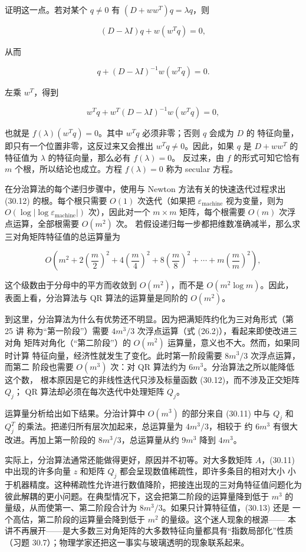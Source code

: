 \documentclass[UTF8,fontset=none,12pt]{ctexart}
\begin{document}
证明这一点。若对某个 $q\ne0$ 有
$(D+ww^T)q=\lambda q$，则

$$
(D-\lambda I)q+w(w^Tq)=0,
$$

从而

$$
q+(D-\lambda I)^{-1}w(w^Tq)=0.
$$

左乘 $w^T$，得到

$$
w^Tq+w^T(D-\lambda I)^{-1}w(w^Tq)=0,
$$

也就是 $f(\lambda)(w^Tq)=0$。其中 $w^Tq$ 必须非零；否则 $q$ 会成为 $D$ 的
特征向量，即只有一个位置非零，这反过来又会推出 $w^Tq\ne0$。因此，如果
$q$ 是 $D+ww^T$ 的特征值为 $\lambda$ 的特征向量，那么必有 $f(\lambda)=0$。
反过来，由 $f$ 的形式可知它恰有 $m$ 个根，所以结论也成立。方程
$f(\lambda)=0$ 称为 secular 方程。

在分治算法的每个递归步骤中，使用与 Newton 方法有关的快速迭代过程求出
(30.12) 的根。每个根只需要 $O(1)$ 次迭代（如果把
$\varepsilon_{\mathrm{machine}}$ 视为变量，则为
$O(\log|\log\varepsilon_{\mathrm{machine}}|)$ 次），因此对一个
$m\times m$ 矩阵，每个根需要 $O(m)$ 次浮点运算，全部根需要 $O(m^2)$ 次。
若假设递归每一步都把维数准确减半，那么求三对角矩阵特征值的总运算量为

\begin{equation}
O\!\left(m^2+2\left(\frac m2\right)^2
 +4\left(\frac m4\right)^2
 +8\left(\frac m8\right)^2
 +\cdots+m\left(\frac m m\right)^2\right),
\tag{30.13}
\end{equation}

这个级数由于分母中的平方而收敛到 $O(m^2)$，而不是 $O(m^2\log m)$。因此，
表面上看，分治算法与 QR 算法的运算量是同阶的 $O(m^2)$。

到这里，分治算法为什么有优势还不明显。因为把满矩阵约化为三对角形式（第 25 讲
称为“第一阶段”）需要 $4m^3/3$ 次浮点运算（式 (26.2)），看起来即使改进三对角
矩阵对角化（“第二阶段”）的 $O(m^2)$ 运算量，意义也不大。然而，如果同时计算
特征向量，经济性就发生了变化。此时第一阶段需要 $8m^3/3$ 次浮点运算，而第二
阶段也需要 $O(m^3)$ 次：对 QR 算法约为 $6m^3$。分治算法之所以能降低这个数，
根本原因是它的非线性迭代只涉及标量函数 (30.12)，而不涉及正交矩阵 $Q_j$；
QR 算法却必须在每次迭代中处理矩阵 $Q_j$。

运算量分析给出如下结果。分治计算中 $O(m^3)$ 的部分来自 (30.11) 中与 $Q_j$
和 $Q_j^T$ 的乘法。把递归所有层次加起来，总运算量为 $4m^3/3$，相较于
约 $6m^3$ 有很大改进。再加上第一阶段的 $8m^3/3$，总运算量从约 $9m^3$
降到 $4m^3$。

实际上，分治算法通常还能做得更好，原因并不初等。对大多数矩阵 $A$，(30.11)
中出现的许多向量 $z$ 和矩阵 $Q_j$ 都会呈现数值稀疏性，即许多条目的相对大小
小于机器精度。这种稀疏性允许进行数值降阶，把接连出现的三对角特征值问题化为
彼此解耦的更小问题。在典型情况下，这会把第二阶段的运算量降到低于 $m^3$ 的
量级，从而使第一、第二阶段合计为 $8m^3/3$。如果只计算特征值，(30.13) 还是
一个高估，第二阶段的运算量会降到低于 $m^2$ 的量级。这个迷人现象的根源——
本讲不再展开——是大多数三对角矩阵的大多数特征向量都具有“指数局部化”性质
（习题 30.7）；物理学家还把这一事实与玻璃透明的现象联系起来。
\end{document}
